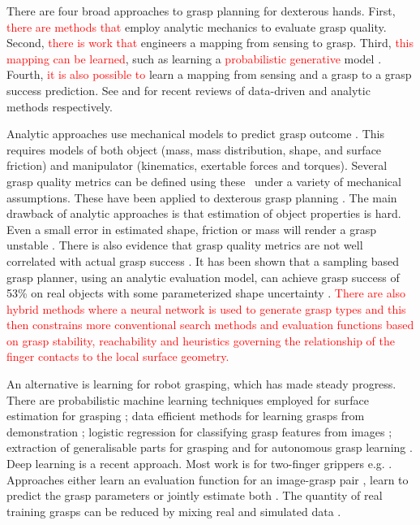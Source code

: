 There are four broad approaches to grasp planning for dexterous hands. First, \textcolor{red}{there are methods that} employ analytic mechanics to evaluate grasp quality. Second, \textcolor{red}{there is work that} engineers a mapping from sensing to grasp. Third, \textcolor{red}{this mapping can be learned}, such as learning a \textcolor{red}{probabilistic generative} model \cite{bishop_pattern_2006}. Fourth, \textcolor{red}{it is also possible to} learn a mapping from sensing and a grasp to a grasp success prediction. See \cite{bohg2014data} and  \cite{sahbani2012overview} for recent reviews of data-driven and analytic methods respectively.

Analytic approaches use mechanical models to predict grasp outcome \cite{bicchi2000a,Liu2000,Pollard2004,miller2004}. This requires models of both object (mass, mass distribution, shape, and surface friction) and manipulator (kinematics, exertable forces and torques). Several grasp quality metrics can be defined using these~\cite{Ferrari1992,Roa2015,Shimoga1996} under a variety of mechanical assumptions. These have been applied to dexterous grasp planning \cite{Boutselis2014,Gori2014,Hang2014,Rosales2012,Saut2012,ciocarlie2009hand}. The main drawback of analytic approaches is that estimation of object properties is hard. Even a small error in estimated shape, friction or mass will render a grasp unstable \cite{zheng2005a}. There is also evidence that grasp quality metrics are not well correlated with actual grasp success \cite{bekiroglu2011b,kim2013a,goins2014a}. It has been shown that a sampling based grasp planner, using an analytic evaluation model, can achieve grasp success of 53\% on real objects with some parameterized shape uncertainty \cite{li2016dexterous}. \textcolor{red}{There are also hybrid methods \cite{Deng2021} where a neural network is used to generate grasp types and this then constrains more conventional search methods and evaluation functions based on grasp stability, reachability and heuristics governing the relationship of the finger contacts to the local surface geometry.} 

An alternative is learning for robot grasping, which has made steady progress. There are probabilistic machine learning techniques employed for surface estimation for grasping \cite{dragiev2011gaussian}; data efficient methods for learning grasps from demonstration \cite{ben-amor2012a,kopicki2015ijrr,Osa2018}; logistic regression for classifying grasp features from images \cite{saxena2008a}; extraction of generalisable parts for grasping \cite{detry2012a} and for autonomous grasp learning \cite{detry2010a}. Deep learning is a recent approach. Most work is for two-finger grippers e.g. \cite{songiros20}. Approaches either learn an evaluation function for an image-grasp pair \cite{levine16,lenz2015deep,gualtieri2016high,mahler2017dex,pinto2016supersizing,johns2016deep}, learn to predict the grasp parameters \cite{redmon2015real,kumra2017iros} or jointly estimate both \cite{morrison18}. The quantity of real training grasps can be reduced by mixing real and simulated data \cite{bousmalis2017using}. 


